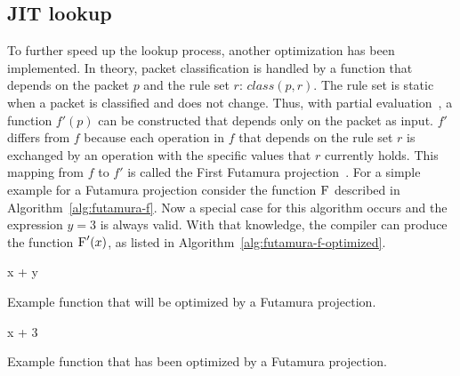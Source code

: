 \documentclass[a4paper,
		12pt,
		parskip=full,
		titlepage
		]{scrartcl}
\begin{document}
\subsection{JIT lookup}
To further speed up the lookup process, another optimization has been implemented.
In theory, packet classification is handled by a function that depends on the packet $p$ and the rule set $r$: $class(p, r)$.
The rule set is static when a packet is classified and does not change.
Thus, with partial evaluation~\cite{partial_eval}, a function $f'(p)$ can be constructed that depends only on the packet as input.
$f'$ differs from $f$ because each operation in $f$ that depends on the 
rule set $r$ is exchanged by an operation with the specific values that $r$ currently holds.
This mapping from $f$ to $f'$ is called the First Futamura projection~\cite{DBLP:journals/ngc/MogensenH88}.
For a simple example for a Futamura projection consider the function $\textsc{F}$ described in Algorithm~\ref{alg:futamura-f}.
Now a special case for this algorithm occurs and the expression $y = 3$ is always valid.
With that knowledge, the compiler can produce the function $\textsc{F}'(x)$, as listed in Algorithm~\ref{alg:futamura-f-optimized}.

\begin{algorithm}
\begin{algorithmic}
    \State \Return x + y
\EndFunction
\end{algorithmic}
\caption{Example function that will be optimized by a Futamura projection.}
\label{alg:futamura-f}
\end{algorithm}

\begin{algorithm}
\begin{algorithmic}
    \State \Return x + 3
\EndFunction
\end{algorithmic}
\caption{Example function that has been optimized by a Futamura projection.}
\label{alg:futamura-f-optimized}
\end{algorithm}
\end{document}
